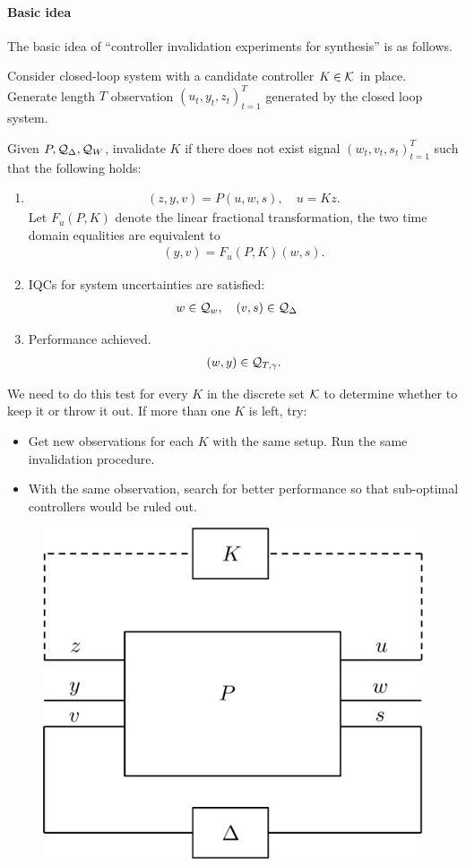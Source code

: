\documentclass[11pt, onecolumn]{article}
\newcommand{\qq}[1]{{\color{magenta}{(#1)}}}
\begin{document}
\paragraph{Basic idea}
The basic idea of ``controller invalidation experiments for synthesis'' is as follows.

Consider closed-loop system with a candidate controller $K\in\mathcal K$ in place.  Generate length $T$
observation $(u_t, y_t, z_t)_{t=1}^{T}$ generated by the closed loop system.

  Given $P, \mathcal Q_{\Delta}, \mathcal Q_{W}$, invalidate $K$ if there does not exist signal $(w_t, v_t,
  s_t)_{t=1}^{T}$ such that the following holds:
\begin{enumerate}
\item
  \begin{align*} (z,y,v) = P (u,w,s), \quad u = K z.
  \end{align*}
  Let $F_u(P,K)$ denote the linear fractional transformation, the two time domain equalities are
  equivalent to
  \begin{align*} (y,v) = F_u(P,K) (w,s).
  \end{align*}

\item IQCs for system  uncertainties are satisfied:
  \begin{align*} & w\in\mathcal Q_w, \quad (v,s) \in \mathcal Q_{\Delta}
  \end{align*}

\item Performance achieved.
  \begin{align*}
    (w,y) \in \mathcal Q_{T, \gamma}.
  \end{align*}
\end{enumerate}
\qq{convex?}

We need to do this test for every $K$ in the discrete set $\mathcal K$ to determine whether to keep it or
throw it out. If more than one $K$ is left, try:
\begin{itemize}
\item Get new observations for each $K$ with the same setup. Run the same invalidation procedure.
\item With the same observation, search for better performance so that sub-optimal controllers would
  be ruled out.
\end{itemize}



\begin{figure}[!ht]
  \centering
  \includegraphics[width=.4\linewidth]{sys1.pdf}
\end{figure}
\end{document}
